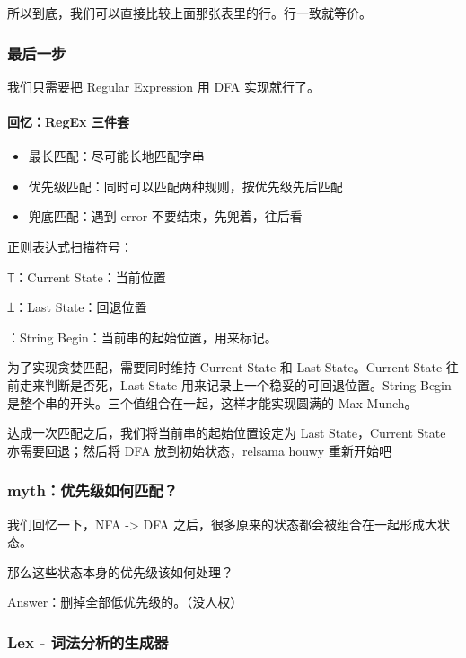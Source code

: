 \documentclass[
]{article}
\begin{document}
所以到底，我们可以直接比较上面那张表里的行。行一致就等价。

\hypertarget{header-n93}{%
\subsubsection{最后一步}\label{header-n93}}

我们只需要把 Regular Expression 用 DFA 实现就行了。

\hypertarget{header-n95}{%
\paragraph{回忆：RegEx 三件套}\label{header-n95}}

\begin{itemize}
\item
  最长匹配：尽可能长地匹配字串
\item
  优先级匹配：同时可以匹配两种规则，按优先级先后匹配
\item
  兜底匹配：遇到 error 不要结束，先兜着，往后看
\end{itemize}

正则表达式扫描符号：

⟙：Current State：当前位置

⟘：Last State：回退位置

\textbar：String Begin：当前串的起始位置，用\textbar 来标记。

为了实现贪婪匹配，需要同时维持 Current State 和 Last State。Current
State 往前走来判断是否死，Last State
用来记录上一个稳妥的可回退位置。String Begin
是整个串的开头。三个值组合在一起，这样才能实现圆满的 Max Munch。

达成一次匹配之后，我们将当前串的起始位置设定为 Last State，Current State
亦需要回退；然后将 DFA 放到初始状态，relsama houwy 重新开始吧

\hypertarget{header-n109}{%
\subsubsection{myth：优先级如何匹配？}\label{header-n109}}

我们回忆一下，NFA -\textgreater{} DFA
之后，很多原来的状态都会被组合在一起形成大状态。

那么这些状态本身的优先级该如何处理？

Answer：删掉全部低优先级的。（没人权）

\hypertarget{header-n113}{%
\subsubsection{Lex - 词法分析的生成器}\label{header-n113}}
\end{document}
